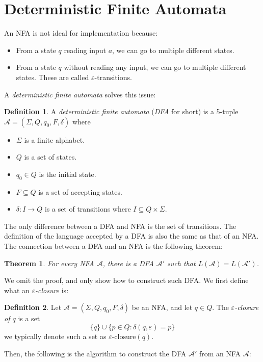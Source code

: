 \documentclass[titlepage]{article}
\theoremstyle{plain}
\newtheorem*{theorem}{Theorem}
\theoremstyle{definition}
\newtheorem*{definition}{Definition}
\theoremstyle{remark}
\begin{document}
\section{Deterministic Finite Automata}
An NFA is not ideal for implementation because:
\begin{itemize}
  \item From a state $q$ reading input $a$, we can go to multiple different
    states.
  \item From a state $q$ without reading any input, we can go to multiple
    different states. These are called $\varepsilon$-transitions.
\end{itemize}
A \textit{deterministic finite automata} solves this issue:
\begin{definition}
  A \textit{deterministic finite automata} (\textit{DFA} for short) is a 5-tuple
  $\mathcal{A}=(\Sigma,Q,q_0,F,\delta)$ where
  \begin{itemize}
    \item $\Sigma$ is a finite alphabet.
    \item $Q$ is a set of states.
    \item $q_0\in Q$ is the initial state.
    \item $F\subseteq Q$ is a set of accepting states.
    \item $\delta:I\to Q$ is a set of transitions where
      $I\subseteq Q\times\Sigma$.
  \end{itemize}
\end{definition}
The only difference between a DFA and NFA is the set of transitions. The
definition of the language accepted by a DFA is also the same as that of an
NFA\@. The connection between a DFA and an NFA is the following theorem:
\begin{theorem}
  For every NFA $\mathcal{A}$, there is a DFA $\mathcal{A}'$ such that
  $L(\mathcal{A})=L(\mathcal{A}')$.
\end{theorem}
We omit the proof, and only show how to construct such DFA\@. We first define
what an \textit{$\varepsilon$-closure} is:
\begin{definition}
  Let $\mathcal{A}=(\Sigma,Q,q_0,F,\delta)$ be an NFA, and let $q\in Q$. The
  \textit{$\varepsilon$-closure of $q$} is a set
  \[
    \{q\}\cup\{p\in Q:\delta(q,\varepsilon)=p\}
  \]
  we typically denote such a set as $\varepsilon\text{-closure}(q)$.
\end{definition}
Then, the following is the algorithm to construct the DFA $\mathcal{A}'$ from an
NFA $\mathcal{A}$:
\end{document}
